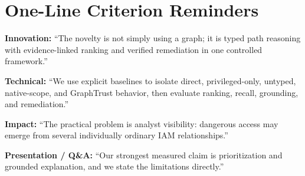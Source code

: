 \documentclass[11pt,a4paper]{article}
\begin{document}
\section*{One-Line Criterion Reminders}

\textbf{Innovation:} ``The novelty is not simply using a graph; it is typed path reasoning with evidence-linked ranking and verified remediation in one controlled framework.''

\textbf{Technical:} ``We use explicit baselines to isolate direct, privileged-only, untyped, native-scope, and GraphTrust behavior, then evaluate ranking, recall, grounding, and remediation.''

\textbf{Impact:} ``The practical problem is analyst visibility: dangerous access may emerge from several individually ordinary IAM relationships.''

\textbf{Presentation / Q\&A:} ``Our strongest measured claim is prioritization and grounded explanation, and we state the limitations directly.''
\end{document}
